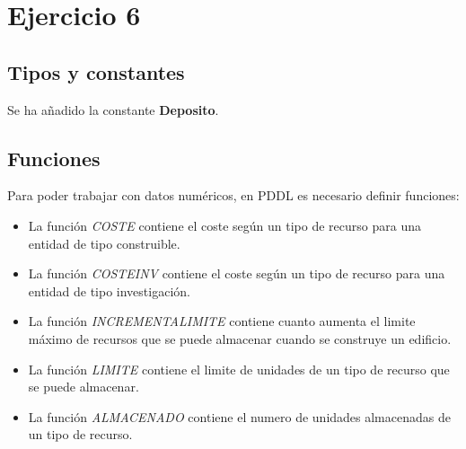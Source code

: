 \section{Ejercicio 6}
\subsection{Tipos y constantes}
Se ha añadido la constante \textbf{Deposito}.
\subsection{Funciones}
Para poder trabajar con datos numéricos, en PDDL es necesario definir funciones:
\begin{itemize}
   \item La función \textit{COSTE} contiene el coste según un tipo de recurso para una entidad de tipo construible.
   \item La función \textit{COSTEINV} contiene el coste según un tipo de recurso para una entidad de tipo investigación.
   \item La función \textit{INCREMENTALIMITE} contiene cuanto aumenta el limite máximo de recursos que se puede almacenar cuando se construye un edificio.
   \item La función \textit{LIMITE} contiene el limite de unidades de un tipo de recurso que se puede almacenar.
   \item La función \textit{ALMACENADO} contiene el numero de unidades almacenadas de un tipo de recurso.
\end{itemize}
